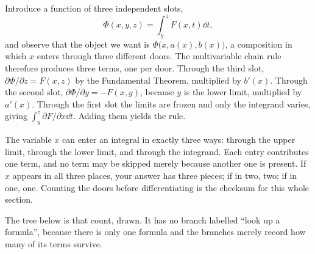 Introduce a function of three independent slots,
\[
\Phi(x,y,z)=\int_{y}^{z}F(x,t)\dd t,
\]
and observe that the object we want is $\Phi\bigl(x,a(x),b(x)\bigr)$, a composition in which $x$ enters through three different doors. The multivariable chain rule therefore produces three terms, one per door. Through the third slot, $\partial\Phi/\partial z=F(x,z)$ by the Fundamental Theorem, multiplied by $b'(x)$. Through the second slot, $\partial\Phi/\partial y=-F(x,y)$, because $y$ is the lower limit, multiplied by $a'(x)$. Through the first slot the limits are frozen and only the integrand varies, giving $\int_{y}^{z}\partial F/\partial x\dd t$. Adding them yields the rule.

\begin{keynote}
The variable $x$ can enter an integral in exactly three ways: through the upper limit, through the lower limit, and through the integrand. Each entry contributes one term, and no term may be skipped merely because another one is present. If $x$ appears in all three places, your answer has three pieces; if in two, two; if in one, one. Counting the doors before differentiating is the checksum for this whole section.
\end{keynote}

The tree below is that count, drawn. It has no branch labelled ``look up a formula'', because there is only one formula and the branches merely record how many of its terms survive.

\begin{center}
\end{center}

